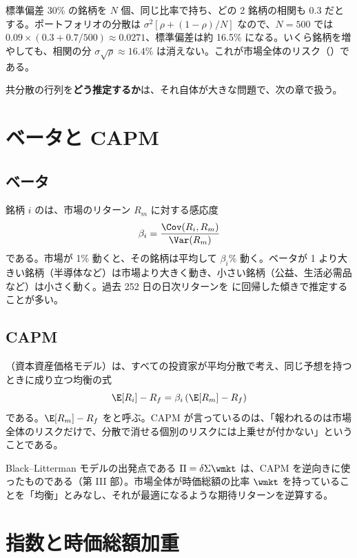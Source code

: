 \begin{exbox}
標準偏差 30\% の銘柄を $N$ 個、同じ比率で持ち、どの 2 銘柄の相関も 0.3 だとする。ポートフォリオの分散は $\sigma^2[\rho + (1-\rho)/N]$ なので、$N=500$ では $0.09\times(0.3+0.7/500)\approx 0.0271$、標準偏差は約 16.5\% になる。いくら銘柄を増やしても、相関の分 $\sigma\sqrt{\rho}\approx16.4\%$ は消えない。これが市場全体のリスク（）である。
\end{exbox}

共分散の行列を\textbf{どう推定するか}は、それ自体が大きな問題で、次の章で扱う。

\section{ベータと CAPM}

\subsection{ベータ}

銘柄 $i$ のは、市場のリターン $R_m$ に対する感応度
\begin{equation}
\beta_i = \frac{\Cov(R_i, R_m)}{\Var(R_m)}
\end{equation}
である。市場が 1\% 動くと、その銘柄は平均して $\beta_i$\% 動く。ベータが 1 より大きい銘柄（半導体など）は市場より大きく動き、小さい銘柄（公益、生活必需品など）は小さく動く。過去 252 日の日次リターンを \SP{} に回帰した傾きで推定することが多い。

\subsection{CAPM}

（資本資産価格モデル）は、すべての投資家が平均分散で考え、同じ予想を持つときに成り立つ均衡の式
\begin{equation}
\E[R_i] - R_f = \beta_i\,(\E[R_m] - R_f)
\label{eq:capm}
\end{equation}
である。$\E[R_m]-R_f$ をと呼ぶ。CAPM が言っているのは、「報われるのは市場全体のリスクだけで、分散で消せる個別のリスクには上乗せが付かない」ということである。

Black--Litterman モデルの出発点である $\Pi = \delta\Sigma\wmkt$ は、CAPM を逆向きに使ったものである（第 III 部）。市場全体が時価総額の比率 $\wmkt$ を持っていることを「均衡」とみなし、それが最適になるような期待リターンを逆算する。

\section{指数と時価総額加重}


